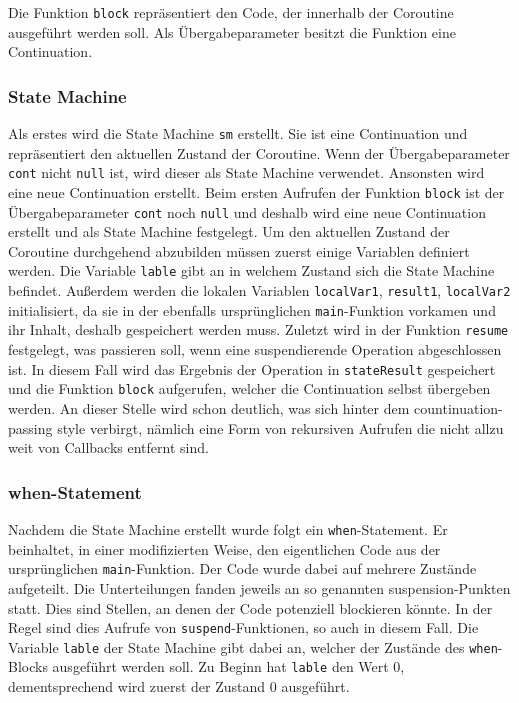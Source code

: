 \documentclass[fontsize=12pt,paper=a4,twoside=semi,parskip=half-,headsepline,headinclude]{scrreprt}
\begin{document}
Die Funktion \texttt{block} repräsentiert den Code, der innerhalb der Coroutine ausgeführt werden soll. Als Übergabeparameter besitzt die Funktion eine Continuation.

\subsubsection{State Machine}

Als erstes wird die State Machine \texttt{sm} erstellt. Sie ist eine Continuation und repräsentiert den aktuellen Zustand der Coroutine\cite{Elizarov2021}. Wenn der Übergabeparameter \texttt{cont} nicht \texttt{null} ist, wird dieser als State Machine verwendet. Ansonsten wird eine neue Continuation erstellt. Beim ersten Aufrufen der Funktion \texttt{block} ist der Übergabeparameter \texttt{cont} noch \texttt{null} und deshalb wird eine neue Continuation erstellt und als State Machine festgelegt. Um den aktuellen Zustand der Coroutine durchgehend abzubilden müssen zuerst einige Variablen definiert werden.  Die Variable \texttt{lable} gibt an in welchem Zustand sich die State Machine befindet. Außerdem werden die lokalen Variablen \texttt{localVar1}, \texttt{result1}, \texttt{localVar2} initialisiert, da sie in der ebenfalls ursprünglichen \texttt{main}-Funktion vorkamen und ihr Inhalt, deshalb gespeichert werden muss. Zuletzt wird in der Funktion \texttt{resume} festgelegt, was passieren soll, wenn eine suspendierende Operation abgeschlossen ist. In diesem Fall wird das Ergebnis der Operation in \texttt{stateResult} gespeichert und die Funktion \texttt{block} aufgerufen, welcher die Continuation selbst übergeben werden. An dieser Stelle wird schon deutlich, was sich hinter dem countinuation-passing style verbirgt, nämlich eine Form von rekursiven Aufrufen die nicht allzu weit von Callbacks entfernt sind.

\subsubsection{when-Statement}

Nachdem die State Machine erstellt wurde folgt ein \texttt{when}-Statement. Er beinhaltet, in einer modifizierten Weise, den eigentlichen Code aus der ursprünglichen \texttt{main}-Funktion. Der Code wurde dabei auf mehrere Zustände aufgeteilt. Die Unterteilungen fanden jeweils an so genannten suspension-Punkten statt. Dies sind Stellen, an denen der Code potenziell blockieren könnte. In der Regel sind dies Aufrufe von \texttt{suspend}-Funktionen, so auch in diesem Fall. Die Variable \texttt{lable} der State Machine gibt dabei an, welcher der Zustände des \texttt{when}-Blocks ausgeführt werden soll. Zu Beginn hat \texttt{lable} den Wert 0, dementsprechend wird zuerst der Zustand 0 ausgeführt. 
\end{document}
